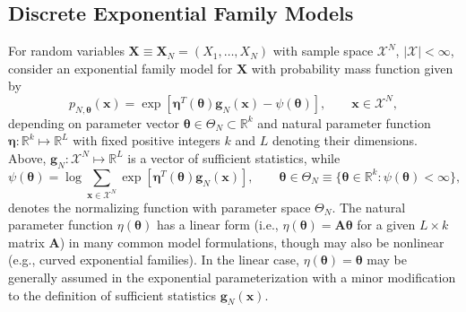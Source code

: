 \documentclass[numbib]{imamat}
\theoremstyle{theorem}
\theoremstyle{lemma}
\theoremstyle{example}
\theoremstyle{corollary}
\theoremstyle{definition}
\theoremstyle{remark}
\theoremstyle{approximation}
\theoremstyle{scheme}
\begin{document}
\hypertarget{discrete-exponential-family-models}{%
\subsection{Discrete Exponential Family
Models}\label{discrete-exponential-family-models}}

For random variables
\(\boldsymbol X \equiv\boldsymbol X_N= (X_1, \dots, X_N)\) with sample
space \(\mathcal{X}^N\), \(|\mathcal{X}| < \infty\), consider an
exponential family model for \(\boldsymbol X\) with probability mass
function given by \begin{equation}
\label{eq:expo}
p_{N, \boldsymbol \theta}(\boldsymbol x) = \exp\left[\boldsymbol\eta^T(\boldsymbol \theta) \boldsymbol g_N(\boldsymbol x) - \psi(\boldsymbol \theta)\right], \qquad \boldsymbol x \in \mathcal{X}^N,
\end{equation} depending on parameter vector
\(\boldsymbol \theta \in \Theta_N \subset \mathbb{R}^{k}\) and natural
parameter function
\(\boldsymbol \eta : \mathbb{R}^k \mapsto \mathbb{R}^L\) with fixed
positive integers \(k\) and \(L\) denoting their dimensions. Above,
\(\boldsymbol g_N : \mathcal{X}^N \mapsto \mathbb{R}^L\) is a vector of
sufficient statistics, while \[
\psi(\boldsymbol \theta) = \log \sum\limits_{\boldsymbol x \in \mathcal{X}^N}\exp\left[\boldsymbol \eta^T(\boldsymbol \theta) \boldsymbol g_N(\boldsymbol x) \right], \qquad \boldsymbol \theta \in \Theta_N\equiv \{\boldsymbol \theta \in \mathbb{R}^k : \psi(\boldsymbol \theta) < \infty \},
\] denotes the normalizing function with parameter space \(\Theta_N\).
The natural parameter function \(\eta (\boldsymbol \theta)\) has a
linear form (i.e.,
\(\eta (\boldsymbol \theta)= \bm{A} \boldsymbol \theta\) for a given
\(L \times k\) matrix \(\bm{A}\)) in many common model formulations,
though may also be nonlinear (e.g., curved exponential families). In the
linear case, \(\eta (\boldsymbol \theta) = \boldsymbol \theta\) may be
generally assumed in the exponential parameterization with a minor
modification to the definition of sufficient statistics
\(\boldsymbol g_N(\boldsymbol x)\).
\end{document}

